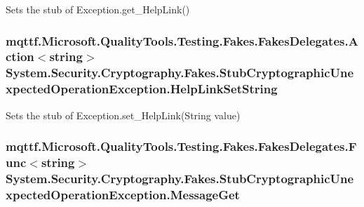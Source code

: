 Sets the stub of Exception.\-get\-\_\-\-Help\-Link()

\hypertarget{class_system_1_1_security_1_1_cryptography_1_1_fakes_1_1_stub_cryptographic_unexpected_operation_exception_a0b82a5740dc9ecbe6ae09c2cdfedefe5}{
\subsubsection[{Help\-Link\-Set\-String}]{\setlength{\rightskip}{0pt plus 5cm}mqttf.\-Microsoft.\-Quality\-Tools.\-Testing.\-Fakes.\-Fakes\-Delegates.\-Action$<$string$>$ System.\-Security.\-Cryptography.\-Fakes.\-Stub\-Cryptographic\-Unexpected\-Operation\-Exception.\-Help\-Link\-Set\-String}}\label{class_system_1_1_security_1_1_cryptography_1_1_fakes_1_1_stub_cryptographic_unexpected_operation_exception_a0b82a5740dc9ecbe6ae09c2cdfedefe5}


Sets the stub of Exception.\-set\-\_\-\-Help\-Link(\-String value)

\hypertarget{class_system_1_1_security_1_1_cryptography_1_1_fakes_1_1_stub_cryptographic_unexpected_operation_exception_a9321b629428d08e9aab617b99db22437}{
\subsubsection[{Message\-Get}]{\setlength{\rightskip}{0pt plus 5cm}mqttf.\-Microsoft.\-Quality\-Tools.\-Testing.\-Fakes.\-Fakes\-Delegates.\-Func$<$string$>$ System.\-Security.\-Cryptography.\-Fakes.\-Stub\-Cryptographic\-Unexpected\-Operation\-Exception.\-Message\-Get}}\label{class_system_1_1_security_1_1_cryptography_1_1_fakes_1_1_stub_cryptographic_unexpected_operation_exception_a9321b629428d08e9aab617b99db22437}


